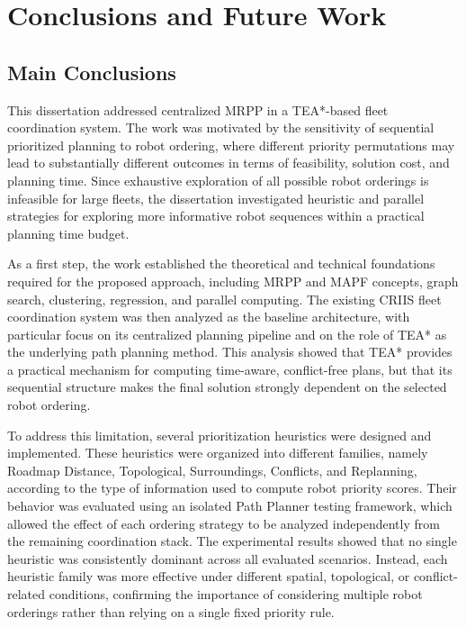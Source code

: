\chapter{Conclusions and Future Work}
\label{chap:ch10}

\section{Main Conclusions}
\hspace{\parindent}
This dissertation addressed centralized MRPP in a TEA*-based fleet coordination system. The work was motivated by the sensitivity of sequential prioritized planning to robot ordering, where different priority permutations may lead to substantially different outcomes in terms of feasibility, solution cost, and planning time. Since exhaustive exploration of all possible robot orderings is infeasible for large fleets, the dissertation investigated heuristic and parallel strategies for exploring more informative robot sequences within a practical planning time budget.

As a first step, the work established the theoretical and technical foundations required for the proposed approach, including MRPP and MAPF concepts, graph search, clustering, regression, and parallel computing. The existing CRIIS fleet coordination system was then analyzed as the baseline architecture, with particular focus on its centralized planning pipeline and on the role of TEA* as the underlying path planning method. This analysis showed that TEA* provides a practical mechanism for computing time-aware, conflict-free plans, but that its sequential structure makes the final solution strongly dependent on the selected robot ordering.

To address this limitation, several prioritization heuristics were designed and implemented. These heuristics were organized into different families, namely Roadmap Distance, Topological, Surroundings, Conflicts, and Replanning, according to the type of information used to compute robot priority scores. Their behavior was evaluated using an isolated Path Planner testing framework, which allowed the effect of each ordering strategy to be analyzed independently from the remaining coordination stack. The experimental results showed that no single heuristic was consistently dominant across all evaluated scenarios. Instead, each heuristic family was more effective under different spatial, topological, or conflict-related conditions, confirming the importance of considering multiple robot orderings rather than relying on a single fixed priority rule.

